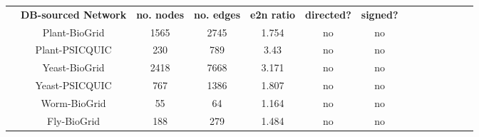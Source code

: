            \begin{table}[H]%
                \centering
                \setlength\arrayrulewidth{.1pt}%
                \scriptsize
                    \setlength\cellspacetoplimit{\myPadTop}\setlength\cellspacebottomlimit{\myPadBottom}
                    \begin{tabular}{@{}Sc Sc|Sc|Sc|Sc|Sc|Sc@{}}
                        & \textbf{\normalsize DB-sourced Network} & \textbf{\normalsize no. nodes} & \textbf{\normalsize no. edges}	& \textbf{\normalsize e2n ratio} & \textbf{\normalsize directed? } & \textbf{\normalsize signed? } %
                            \\[.05cm] 
                                    & Plant-BioGrid  \cite{chatr-aryamontri_biogrid_2017}  & 1565      & 2745   & 1.754   & no & no %
                            \\[.05cm] 
                                   & Plant-PSICQUIC  \cite{aranda_psicquic_2011}         & 230       & 789       & 3.43   & no & no   %
                            \\[.05cm] 
                                    & Yeast-BioGrid  \cite{chatr-aryamontri_biogrid_2017}  & 2418      & 7668      & 3.171  & no & no    %
                            \\[.05cm] 
                                    & Yeast-PSICQUIC  \cite{aranda_psicquic_2011}        & 767       & 1386      & 1.807  & no & no    %
                            \\[.05cm] 
                                    & Worm-BioGrid  \cite{chatr-aryamontri_biogrid_2017}   & 55        & 64        & 1.164  & no & no    %
                            \\[.05cm] 
                                    & Fly-BioGrid  \cite{chatr-aryamontri_biogrid_2017}    & 188       & 279       & 1.484  & no & no    %
                            \\[.05cm] 

\end{tabular}
\end{table}
